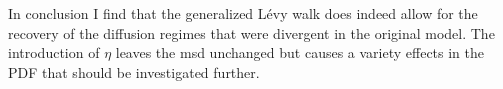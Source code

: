 In conclusion I find that the generalized L\'evy walk  does indeed allow for the recovery of the diffusion regimes that were divergent in the original model. The introduction of $\eta$ leaves the \gls{msd} unchanged but causes a variety effects in the \gls{PDF} that should be investigated further.

